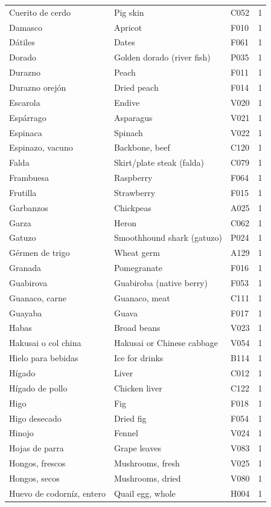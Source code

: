 {\begin{longtable}{p{4.3cm}p{5.5cm}p{1.5cm}p{0.7cm}}
Cuerito de cerdo & Pig skin & C052 & 1\\
Damasco & Apricot & F010 & 1\\
Dátiles & Dates & F061 & 1\\
Dorado & Golden dorado (river fish) & P035 & 1\\
Durazno & Peach & F011 & 1\\
Durazno orejón & Dried peach & F014 & 1\\
Escarola & Endive & V020 & 1\\
Espárrago & Asparagus & V021 & 1\\
Espinaca & Spinach & V022 & 1\\
Espinazo, vacuno & Backbone, beef & C120 & 1\\
Falda & Skirt/plate steak (falda) & C079 & 1\\
Frambuesa & Raspberry & F064 & 1\\
Frutilla & Strawberry & F015 & 1\\
Garbanzos & Chickpeas & A025 & 1\\
Garza & Heron & C062 & 1\\
Gatuzo & Smoothhound shark (gatuzo) & P024 & 1\\
Gérmen de trigo & Wheat germ & A129 & 1\\
Granada & Pomegranate & F016 & 1\\
Guabirova & Guabiroba (native berry) & F053 & 1\\
Guanaco, carne & Guanaco, meat & C111 & 1\\
Guayaba & Guava & F017 & 1\\
Habas & Broad beans & V023 & 1\\
Hakusai o col china & Hakusai or Chinese cabbage & V054 & 1\\
Hielo para bebidas & Ice for drinks & B114 & 1\\
Hígado & Liver & C012 & 1\\
Hígado de pollo & Chicken liver & C122 & 1\\
Higo & Fig & F018 & 1\\
Higo desecado & Dried fig & F054 & 1\\
Hinojo & Fennel & V024 & 1\\
Hojas de parra & Grape leaves & V083 & 1\\
Hongos, frescos & Mushrooms, fresh & V025 & 1\\
Hongos, secos & Mushrooms, dried & V080 & 1\\
Huevo de codorníz, entero & Quail egg, whole & H004 & 1\\

\end{longtable}}
